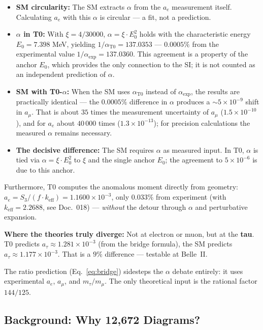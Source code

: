 \begin{itemize}
	\item \textbf{SM circularity:} The SM extracts $\alpha$ from the $a_e$ measurement itself. Calculating $a_e$ with this $\alpha$ is circular --- a fit, not a prediction.
	\item \textbf{$\alpha$ in T0:} With $\xi = 4/30000$, $\alpha = \xi \cdot E_0^2$ holds with the characteristic energy $E_0 = 7.398$ MeV, yielding $1/\alpha_\text{T0} = 137.0353$ --- $0.0005\%$ from the experimental value $1/\alpha_\text{exp} = 137.0360$. This agreement is a property of the anchor $E_0$, which provides the only connection to the SI; it is not counted as an independent prediction of $\alpha$.
	\item \textbf{SM with T0-$\alpha$:} When the SM uses $\alpha_\text{T0}$ instead of $\alpha_\text{exp}$, the results are practically identical --- the $0.0005\%$ difference in $\alpha$ produces a $\sim 5 \times 10^{-9}$ shift in $a_\mu$. That is about $35$ times the measurement uncertainty of $a_\mu$ ($1.5\times10^{-10}$), and for $a_e$ about $40\,000$ times ($1.3\times10^{-13}$); for precision calculations the measured $\alpha$ remains necessary.
	\item \textbf{The decisive difference:} The SM requires $\alpha$ as measured input. In T0, $\alpha$ is tied via $\alpha = \xi \cdot E_0^2$ to $\xi$ and the single anchor $E_0$; the agreement to $5 \times 10^{-6}$ is due to this anchor.
\end{itemize}

Furthermore, T0 computes the anomalous moment directly from geometry: $a_e = S_3/(f \cdot k_\text{eff}) = 1.1600 \times 10^{-3}$, only $0.033\%$ from experiment (with $k_\text{eff} = 2.2688$, see Doc.~018) --- \textit{without} the detour through $\alpha$ and perturbative expansion.

\textbf{Where the theories truly diverge:} Not at electron or muon, but at the \textbf{tau}. T0 predicts $a_\tau \approx 1.281 \times 10^{-3}$ (from the bridge formula), the SM predicts $a_\tau \approx 1.177 \times 10^{-3}$. That is a $9\%$ difference --- testable at Belle~II.

The ratio prediction (Eq.~\ref{eq:bridge}) sidesteps the $\alpha$ debate entirely: it uses experimental $a_e$, $a_\mu$, and $m_\tau/m_\mu$. The only theoretical input is the rational factor $144/125$.

\subsection{Background: Why 12,672 Diagrams?}

